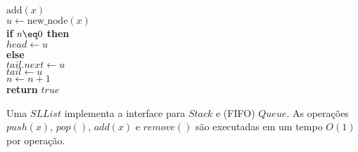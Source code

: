 \documentclass{beamer}
\begin{document}
\begin{frame}
{\begin{framed}
\begin{flushleft}
\hspace*{1em} \ensuremath{\mathrm{add}(\ensuremath{\mathit{x}})}\\
\hspace*{1em} \hspace*{1em} \ensuremath{\ensuremath{\mathit{u}} \gets  \ensuremath{\mathrm{new\_node}(\ensuremath{\mathit{x}})}}\\
\hspace*{1em} \hspace*{1em} {\color{black} \textbf{if}} \ensuremath{\ensuremath{\mathit{n}} \eq 0} {\color{black} \textbf{then}} \\
\hspace*{1em} \hspace*{1em} \hspace*{1em} \ensuremath{\ensuremath{\mathit{head}} \gets  \ensuremath{u}}\\
\hspace*{1em} \hspace*{1em} {\color{black} \textbf{else}} \\
\hspace*{1em} \hspace*{1em} \hspace*{1em} \ensuremath{\ensuremath{\mathit{tail}}.\ensuremath{next} \gets  \ensuremath{u}}\\
\hspace*{1em} \hspace*{1em} \ensuremath{\ensuremath{\mathit{tail}} \gets  \ensuremath{u}}\\
\hspace*{1em} \hspace*{1em} \ensuremath{\ensuremath{\mathit{n}} \gets  \ensuremath{\ensuremath{\mathit{n}} + 1}}\\
\hspace*{1em} \hspace*{1em} {\color{black} \textbf{return}} \ensuremath{\ensuremath{\mathit{true}}}\\
\end{flushleft}
\end{framed}
}
\end{frame}


\begin{frame}
	Uma $SLList$ implementa a interface para $Stack$ e (FIFO) $Queue$. 
	As operações $push(x)$, $pop()$, $add(x)$ e $remove()$ são executadas 
	em um tempo $O(1)$ por operação.
\end{frame}
\end{document}
